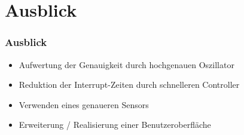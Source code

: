 \section{Ausblick}
\begin{frame}
	\frametitle{Ausblick}
	\begin{itemize}
		\item Aufwertung der Genauigkeit durch hochgenauen Oszillator
		\item Reduktion der Interrupt-Zeiten durch schnelleren Controller
		\item Verwenden eines genaueren Sensors
        \item Erweiterung / Realisierung einer Benutzeroberfläche
	\end{itemize}
\end{frame}